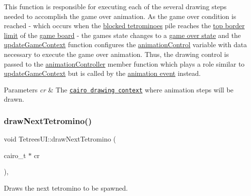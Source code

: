 This function is responsible for executing each of the several drawing steps needed to accomplish the game over animation. As the game over condition is reached -\/ which occurs when the \hyperlink{classTetreesEngine_a0978ef1f287f00a8ed5a4af2d680b943}{blocked tetrominoes} pile reaches the \hyperlink{TetreesDefs_8hpp_a5dbb1ebfe8a9b95707ac161d3549ed8aa3f2dceb813401410ad271665ae004acb}{top border limit} of the \hyperlink{classTetreesEngine_a37d082a7816d6731b2703dd6d1a1cb97}{game board} -\/ the game\textquotesingle{}s state changes to a \hyperlink{TetreesDefs_8hpp_aebae08b2e3a36f1452b33acaf1eaab40a2c9a2640a3b890ed907410e9dc3f7425}{game over state} and the \hyperlink{classTetreesUI_a0fe8ccb5c1c594792591036f4f02175f}{update\+Game\+Context} function configures the \hyperlink{classTetreesUI_a06df6e44abd5d521448cf1299433b55c}{animation\+Control} variable with data necessary to execute the game over animation. Thus, the drawing control is passed to the \hyperlink{classTetreesUI_adfb21fb6812e45bebe1e6e9b608786a0}{animation\+Controller} member function which plays a role similar to \hyperlink{classTetreesUI_a0fe8ccb5c1c594792591036f4f02175f}{update\+Game\+Context} but is called by the \hyperlink{TetreesDefs_8hpp_a607bc7bf79fa19b90a730745ca487a4b}{animation event} instead. 
\begin{DoxyParams}{Parameters}
{\em cr} & The \href{https://www.cairographics.org/manual/cairo-cairo-t.html}{\tt cairo drawing context} where animation steps will be drawn. \\
\hline
\end{DoxyParams}
\mbox{\label{classTetreesUI_a9f4fa68c99e9d6146d9bdf2baa9db4d6}} 
\subsubsection{\texorpdfstring{draw\+Next\+Tetromino()}{drawNextTetromino()}}
{\footnotesize\ttfamily void Tetrees\+U\+I\+::draw\+Next\+Tetromino (\begin{DoxyParamCaption}\item[{cairo\+\_\+t $\ast$}]{cr }\end{DoxyParamCaption})\hspace{0.3cm}{\ttfamily [static]}, {\ttfamily [private]}}



Draws the next tetromino to be spawned. 

